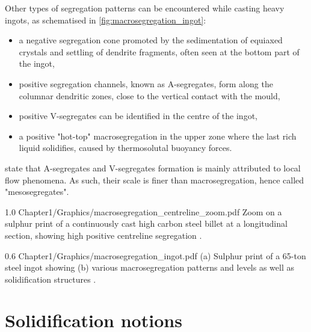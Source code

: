 Other types of segregation patterns can be encountered while casting heavy ingots, as schematised in \cref{fig:macrosegregation_ingot}: 
\begin{itemize}
\itemsep0em 
\item a negative segregation cone promoted by the sedimentation of 
	  equiaxed crystals and settling of dendrite fragments, often seen at the bottom part of the ingot,
\item positive segregation channels, known as A-segregates, form along the columnar dendritic zones, close to the vertical contact with the mould,
\item positive V-segregates can be identified in the centre of the ingot,
\item a positive "hot-top" macrosegregation in the upper zone where the last rich liquid solidifies, caused by thermosolutal buoyancy forces. 
\end{itemize}
\citet{combeau_prediction_2009} state that A-segregates and V-segregates formation is mainly attributed to local flow phenomena.
As such, their scale is finer than macrosegregation, hence called "mesosegregates".

\begin{figureth}
{1.0}
{Chapter1/Graphics/macrosegregation_centreline_zoom.pdf}
{Zoom on a sulphur print of a continuously cast high carbon steel billet at a longitudinal section, showing high positive centreline segregation \citep{choudhary_morphology_2007}.}
\label{fig:macroseg_centreline}
\end{figureth}

\begin{figureth}
{0.6}
{Chapter1/Graphics/macrosegregation_ingot.pdf}
{ (a) Sulphur print of a 65-ton steel ingot showing (b) various macrosegregation patterns and levels as well as solidification structures \citep{lesoult_macrosegregation_2005}.}
\label{fig:macrosegregation_ingot}
\end{figureth}


\section{Solidification notions}
%
